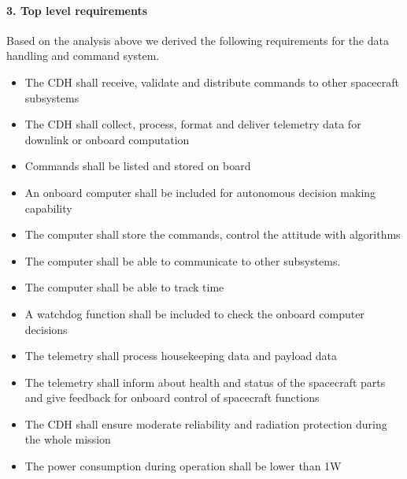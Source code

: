 \paragraph{3. Top level requirements}
Based on the analysis above we derived the following requirements for the data handling and command system.

\begin{itemize}
	\item The CDH shall receive, validate and distribute commands to other spacecraft subsystems
	\item The CDH shall collect, process, format and deliver telemetry data for downlink or onboard computation
	\item Commands shall be listed and stored on board
	\item An onboard computer shall be included for autonomous decision making capability
	\item The computer shall store the commands, control the attitude with algorithms
	\item The computer shall be able to communicate to other subsystems.
	\item The computer shall be able to track time
	\item A watchdog function shall be included to check the onboard computer decisions
	\item The telemetry shall process housekeeping data and payload data
	\item The telemetry shall inform about health and status of the spacecraft parts and give feedback for onboard control of spacecraft functions
	\item The CDH shall ensure moderate reliability and radiation protection during the whole mission
	\item The power consumption during operation shall be lower than 1W
\end{itemize}

